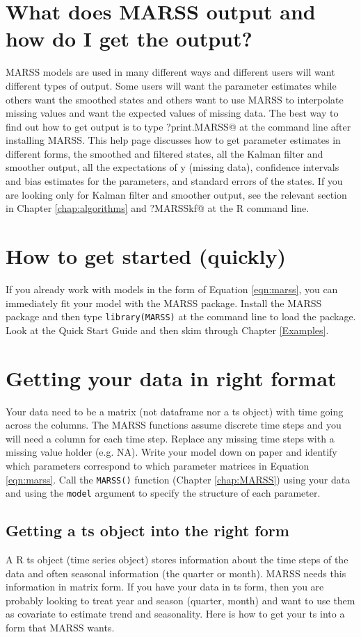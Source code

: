 \section{What does MARSS output and how do I get the output?}
MARSS models are used in many different ways and different users will want different types of output.  Some users will want the parameter estimates while others want the smoothed states and others want to use MARSS to interpolate missing values and want the expected values of missing data.  The best way to find out how to get output is to type \verb@?print.MARSS@ at the command line after installing MARSS.  This help page discusses how to get parameter estimates in different forms, the smoothed and filtered states, all the Kalman filter and smoother output, all the expectations of y (missing data), confidence intervals and bias estimates for the parameters, 
and standard errors of the states.  If you are looking only for Kalman filter and smoother output, see the relevant section in Chapter \ref{chap:algorithms} and \verb@?MARSSkf@ at the R command line.

\section{How to get started (quickly)}

If you already work with models in the form of Equation \ref{eqn:marss}, you can immediately fit your model with the MARSS package.  Install the MARSS package and then type \texttt{library(MARSS)} at the command line to load the package.  Look at the Quick Start Guide and then skim through Chapter \ref{Examples}.  

\section{Getting your data in right format}
Your data need to be a matrix (not dataframe nor a ts object) with time going across the columns.  The MARSS functions assume discrete time steps and you will need a column for each time step.  Replace any missing time steps with a missing value holder (e.g. NA).  Write your model down on paper and identify which parameters correspond to which parameter matrices in Equation \ref{eqn:marss}.  Call the \texttt{MARSS()} function (Chapter \ref{chap:MARSS}) using your data and using the \texttt{model} argument to specify the structure of each parameter. 

\subsection{Getting a ts object into the right form}
A R ts object (time series object) stores information about the time steps of the data and often seasonal information (the quarter or month).  MARSS needs this information in matrix form.  If you have your data in ts form, then you are probably looking to treat year and season (quarter, month) and want to use them as covariate to estimate trend and seasonality.  Here is how to get your ts into a form that MARSS wants.

